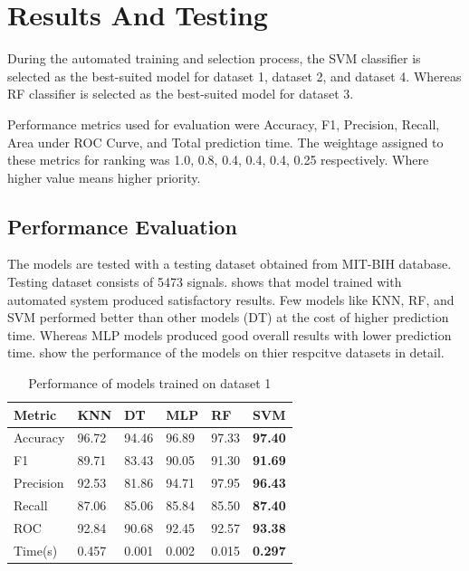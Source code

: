 \section{Results And Testing} \label{sec:results_and_testing}
During the automated training and selection process, the SVM classifier is selected as the best-suited model for dataset 1, dataset 2, and dataset 4. Whereas RF classifier is selected as the best-suited model for dataset 3. 

Performance metrics used for evaluation were Accuracy, F1, Precision, Recall, Area under ROC Curve, and Total prediction time. The weightage assigned to these metrics for ranking was 1.0, 0.8, 0.4, 0.4, 0.4, 0.25 respectively. Where higher value means higher priority.

\subsection{Performance Evaluation} \label{subsec:performance_evaluation}
The models are tested with a testing dataset obtained from MIT-BIH database. Testing dataset consists of 5473 signals.  shows that model trained with automated system produced satisfactory results. Few models like KNN, RF, and SVM performed better than other models (DT) at the cost of higher prediction time. Whereas MLP models produced good overall results with lower prediction time.
 show the performance of the models on thier respcitve datasets in detail.

\begin{table}[hbt]
\caption{Performance of models trained on dataset 1} \label{tab:performance_of_models_trained_on_dataset_1}
\begin{tabular*}{\tblwidth}{@{}LLLLLL@{}}
    \toprule
    Metric & KNN & DT & MLP & RF & \textbf{SVM} \\
    \midrule
    Accuracy & 96.72 & 94.46 & 96.89 & 97.33 & \textbf{97.40} \\
    F1 & 89.71 & 83.43 & 90.05 & 91.30 & \textbf{91.69} \\
    Precision & 92.53 & 81.86 & 94.71 & 97.95 & \textbf{96.43} \\
    Recall & 87.06 & 85.06 & 85.84 & 85.50 & \textbf{87.40} \\
    ROC & 92.84 & 90.68 & 92.45 & 92.57 & \textbf{93.38} \\
    Time(s) & 0.457 & 0.001 & 0.002 & 0.015 & \textbf{0.297} \\
    \bottomrule
\end{tabular*}
\end{table}

